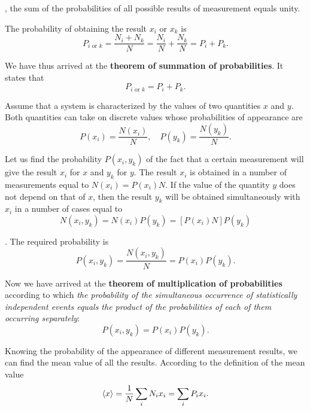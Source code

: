 \noindent
\ie, the sum of the probabilities of all possible results of measurement equals unity.

The probability of obtaining the result $x_i$ or $x_k$ is
\begin{equation*}
	P_{i\text{ or }k} = \frac{N_i + N_k}{N} = \frac{N_i}{N} + \frac{N_k}{N} = P_i + P_k.
\end{equation*}

\noindent
We have thus arrived at the \textbf{theorem of summation of probabilities}. It states that
\begin{equation}\label{eq:11_3}
	P_{i\text{ or }k} = P_i + P_k.
\end{equation}

Assume that a system is characterized by the values of two quantities $x$ and $y$. Both quantities can take on discrete values whose probabilities of appearance are
\begin{equation*}
	P(x_i) = \frac{N(x_i)}{N},\quad P(y_k) = \frac{N(y_k)}{N}.
\end{equation*}

\noindent
Let us find the probability $P(x_i,y_k)$ of the fact that a certain measurement will give the result $x_i$ for $x$ and $y_k$ for $y$. The result $x_i$ is obtained in a number of measurements equal to $N(x_i)=P(x_i)N$. If the value of the quantity $y$ does not depend on that of $x$, then the result $y_k$ will be obtained simultaneously with $x_i$ in a number of cases equal to
\begin{equation*}
	N(x_i,y_k) = N(x_i) P(y_k) = [P(x_i) N] P(y_k)
\end{equation*}

. The required probability is
\begin{equation*}
	P(x_i,y_k) = \frac{N(x_i,y_k)}{N} = P(x_i) P(y_k).
\end{equation*}

\noindent
Now we have arrived at the \textbf{theorem of multiplication of probabilities} according to which \textit{the probability of the simultaneous occurrence of statistically independent events equals the product of the probabilities of each of them occurring separately}:
\begin{equation}\label{eq:11_4}
	P(x_i,y_k) = P(x_i) P(y_k).
\end{equation}

Knowing the probability of the appearance of different measurement results, we can find the mean value of all the results. According to the definition of the mean value
\begin{equation}\label{eq:11_5}
	\left\langle x \right\rangle = \frac{1}{N}\sum_i N_i x_i = \sum_i P_i x_i.
\end{equation}

